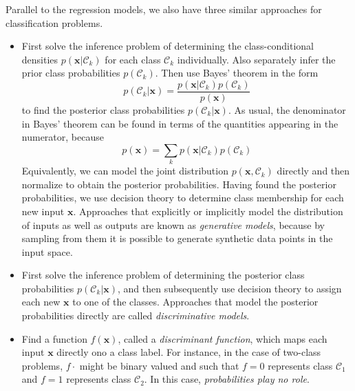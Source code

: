 \documentclass[a4paper]{report}
\renewcommand{\bf}{\mathbf}
\renewcommand{\cal}{\mathcal}
\newcommand{\imp}[1]{{\color{blue}\textit{#1}}}
\begin{document}
Parallel to the regression models, we also have three similar approaches for classification problems.
\begin{itemize}
\item First solve the inference problem of determining the class-conditional densities $p(\bf{x}|\cal{C}_k)$ for each class $\cal{C}_k$ individually. Also separately infer the prior class probabilities $p(\cal{C}_k)$. Then use Bayes' theorem in the form
\begin{equation}
	p(\cal{C}_k|\bf{x})=\frac{p(\bf{x}|\cal{C}_k)p(\cal{C}_k)}{p(\bf{x})}
\end{equation}
to find the posterior class probabilities $p(\cal{C}_k|\bf{x})$. As usual, the denominator in Bayes' theorem can be found in terms of the quantities appearing in the numerator, because
\begin{equation}
p(\bf{x}) = \sum_{k}p(\bf{x}|\cal{C}_k)p(\cal{C}_k)
\end{equation}
Equivalently, we can model the joint distribution $p(\bf{x},\cal{C}_k)$ directly and then normalize to obtain the posterior probabilities. Having found the posterior probabilities, we use decision theory to determine class membership for each new input $\bf{x}$. Approaches that explicitly or implicitly model the distribution of inputs as well as outputs are known as \imp{generative models}, because by sampling from them it is possible to generate synthetic data points in the input space.
\item First solve the inference problem of determining the posterior class probabilities $p(\cal{C}_k|\bf{x})$, and then subsequently use decision theory to assign each new $\bf{x}$ to one of the classes. Approaches that model the posterior probabilities directly are called \imp{discriminative models}.
\item Find a function $f(\bf{x})$, called a \imp{discriminant function}, which maps each input $\bf{x}$ directly ono a class label. For instance, in the case of two-class problems, $f{\cdot}$ might be binary valued and such that $f=0$ represents class $\cal{C}_1$ and $f=1$ represents class $\cal{C}_2$. In this case, \imp{probabilities play no role}.
\end{itemize}
\end{document}
